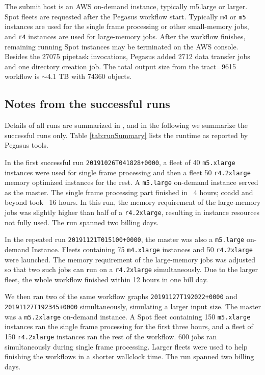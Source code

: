 The submit host is an AWS on-demand instance, typically m5.large or larger.
Spot fleets are requested after the Pegasus workflow start.
Typically \texttt{m4} or \texttt{m5} instances are used for the single frame processing or other small-memory jobs, and \texttt{r4} instances are used for large-memory jobs.
After the workflow finishes, remaining running Spot instances may be terminated on the AWS console.
Besides the 27075 pipetask invocations, Pegasus added 2712 data transfer jobs and one directory creation job.
The total output size from the tract=9615 workflow is $\sim$4.1 TB with 74360 objects.

\subsection{Notes from the successful runs}

Details of all runs are summarized in , and in the following we summarize the successful runs only.
Table \ref{tab:runSummary} lists the runtime as reported by Pegasus tools.



In the first successful run \texttt{20191026T041828+0000}, a fleet of 40 \texttt{m5.xlarge} instances were used for single frame processing and then a fleet 50 \texttt{r4.2xlarge} memory optimized instances for the rest.
A \texttt{m5.large} on-demand instance served as the master.
The single frame processing part finished in ~4 hours; coadd and beyond took ~16 hours.
In this run, the memory requirement of the large-memory jobs was slightly higher than half of a \texttt{r4.2xlarge}, resulting in instance resources not fully used.
The run spanned two billing days.

In the repeated run \texttt{20191121T015100+0000}, the master was also a \texttt{m5.large} on-demand Instance.
Fleets containing 75 \texttt{m4.xlarge} instances and 50 \texttt{r4.2xlarge} were launched.
The memory requirement of the large-memory jobs was adjusted so that two such jobs can run on a \texttt{r4.2xlarge} simultaneously.
Due to the larger fleet, the whole workflow finished within 12 hours in one bill day.

We then ran two of the same workflow graphs \texttt{20191127T192022+0000} and \texttt{20191127T192345+0000} simultaneously, simulating a larger input size.
The master was a \texttt{m5.2xlarge} on-demand instance.
A Spot fleet containing 150 \texttt{m5.xlarge} instances ran the single frame processing for the first three hours, and a fleet of 150 \texttt{r4.2xlarge} instances ran the rest of the workflow.
600 jobs ran simultaneously during single frame processing.
Larger fleets were used to help finishing the workflows in a shorter wallclock time.
The run spanned two billing days.


